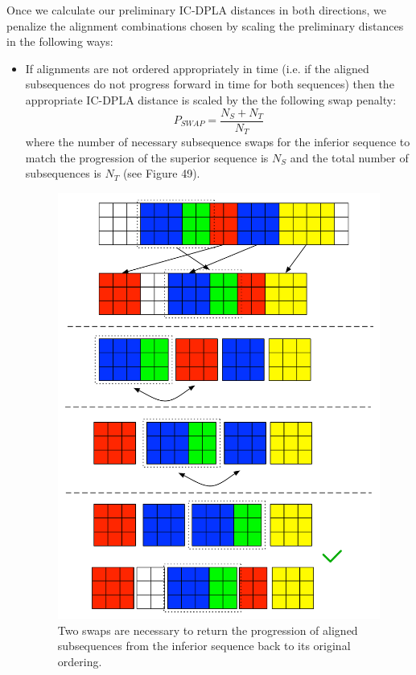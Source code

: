 \documentclass[12pt]{report} 	%
\numberwithin{figure}{chapter}
\numberwithin{table}{chapter}
\numberwithin{equation}{chapter}
\begin{document}
\begin{flushleft}
Once we calculate our preliminary IC-DPLA distances in both directions, we penalize the alignment combinations chosen by scaling the preliminary distances in the following ways:
\begin{itemize}
\item If alignments are not ordered appropriately in time (i.e. if the aligned subsequences do not progress forward in time for both sequences) then the appropriate IC-DPLA distance is scaled by the the following swap penalty:
\begin{equation}
P_{SWAP} = \frac{N_S+N_T}{N_T}
\end{equation}
where the number of necessary subsequence swaps for the inferior sequence to match the progression of the superior sequence is $N_S$ and the total number of subsequences is $N_T$ (see Figure 49).
\begin{figure}[h!]
\begin{center}
\includegraphics[scale=0.7]{Penalty_1}
\caption[Penalizing swaps]{Two swaps are necessary to return the progression of aligned subsequences from the inferior sequence back to its original ordering.}

\end{center}
\end{figure}
\end{itemize}
\end{flushleft}
\end{document}
